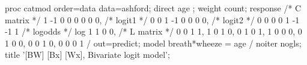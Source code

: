 \begin{listing}
proc catmod order=data data=ashford;
   direct age ;
   weight count;
   response                      /* C matrix */
     1 -1  0  0  0  0  0  0,     /* logit1 */
     0  0  1 -1  0  0  0  0,     /* logit2 */
     0  0  0  0  1 -1 -1  1      /* logodds */
      log
        1  1  0  0,              /* L matrix */
        0  0  1  1,
        1  0  1  0,
        0  1  0  1,
        1  0  0  0,
        0  1  0  0,
        0  0  1  0,
        0  0  0  1 / out=predict;                       
   model breath*wheeze = age  /  noiter nogls;
   title '[BW] [Bx] [Wx], Bivariate logit model';

\end{listing}
